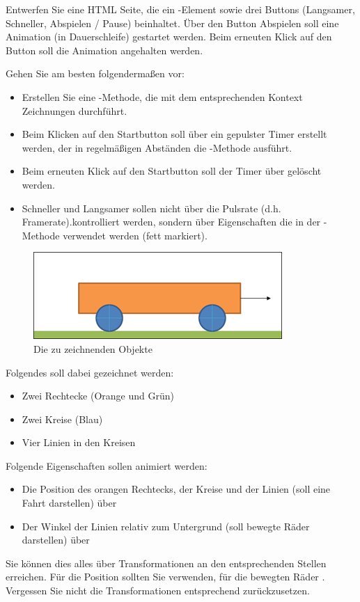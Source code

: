 %
\par Entwerfen Sie eine HTML Seite, die ein -Element sowie drei Buttons (Langsamer, Schneller, Abspielen / Pause) beinhaltet. Über den Button Abspielen soll eine Animation (in Dauerschleife) gestartet werden. Beim erneuten Klick auf den Button soll die Animation angehalten werden.
%
\par Gehen Sie am besten folgendermaßen vor:
%
\begin{itemize}
\item Erstellen Sie eine -Methode, die mit dem entsprechenden Kontext Zeichnungen durchführt.
\item Beim Klicken auf den Startbutton soll über  ein gepulster Timer erstellt werden, der in regelmäßigen Abständen die -Methode ausführt.
\item Beim erneuten Klick auf den Startbutton soll der Timer über  gelöscht werden.
\item Schneller und Langsamer sollen nicht über die Pulsrate (d.h. Framerate).kontrolliert werden, sondern über Eigenschaften die in der -Methode verwendet werden (fett markiert).
\end{itemize}
%
\begin{figure}[!h]
\centering
\includegraphics{Figures/car.png}
\caption{Die zu zeichnenden Objekte}
\label{fig:car}
\end{figure}
%
\par Folgendes soll dabei gezeichnet werden:
%
\begin{itemize}
\item Zwei Rechtecke (Orange und Grün)
\item Zwei Kreise (Blau)
\item Vier Linien in den Kreisen
\end{itemize}
%
\par Folgende Eigenschaften sollen animiert werden:
%
\begin{itemize}
\item Die Position des orangen Rechtecks, der Kreise und der Linien (soll eine Fahrt darstellen) über 
\item Der Winkel der Linien relativ zum Untergrund (soll bewegte Räder darstellen) über 
\end{itemize}
%
\par Sie können dies alles über Transformationen an den entsprechenden Stellen erreichen. Für die Position sollten Sie  verwenden, für die bewegten Räder . Vergessen Sie nicht die Transformationen entsprechend zurückzusetzen.
